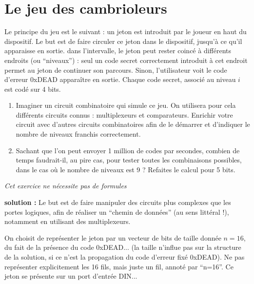 \documentclass[a4paper,11pt]{article}
\begin{document}
\section{Le jeu des cambrioleurs}
Le principe du jeu est le suivant : un jeton est introduit par le joueur en haut du dispositif. Le but est de faire circuler ce jeton dans le dispositif, jusqu'à ce qu'il apparaisse en sortie. dans l'intervalle, le jeton peut rester coincé à différents endroits (ou ``niveaux'') : seul un code secret correctement introduit à cet endroit permet au jeton de continuer son parcours. Sinon, l'utilisateur voit le code d'erreur 0xDEAD apparaître en sortie. Chaque code secret, associé au niveau $i$ est codé sur 4 bits.
\begin{enumerate}
\item Imaginer un circuit combinatoire qui simule ce jeu.  On utilisera pour cela différents circuits connus : multiplexeurs et comparateurs. Enrichir votre circuit avec d'autres circuits combinatoires afin de le démarrer et d'indiquer le nombre de niveaux franchis correctement.
\item Sachant que l'on peut envoyer 1 million de codes par secondes, combien de temps faudrait-il, au pire cas, pour tester toutes les combinaisons possibles, dans le cas où le nombre de niveaux est 9 ? Refaites le calcul pour 5 bits.
\end{enumerate}
{\it Cet exercice ne nécessite pas de formules}\\

\begin{cadre}
{\bf solution :}
Le but est de faire manipuler des circuits plus complexes que les portes logiques, afin de réaliser un ``chemin de données'' (au sens littéral !), notamment en utilisant des multiplexeurs.

On choisit de représenter le jeton par un vecteur de bits de taille donnée $n=16$, du fait de la présence du code 0xDEAD... (la taille n'influe pas sur la structure de la solution, si ce n'est la propagation du code d'erreur fixé 0xDEAD). Ne pas représenter explicitement les 16 fils, mais juste un fil, annoté par ``n=16''. Ce jeton se présente sur un port d'entrée DIN...
\end{cadre}
\end{document}
